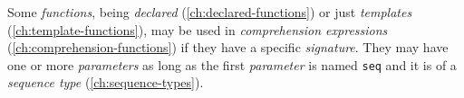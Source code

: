 Some \emph{functions},
being \emph{declared} (\ref{ch:declared-functions})
or just \emph{templates} (\ref{ch:template-functions}),
may be used in \emph{comprehension expressions} (\ref{ch:comprehension-functions})
if they have a specific \emph{signature}.
They may have one or more \emph{parameters}
as long as the first \emph{parameter} is named \verb|seq|
and it is of a \emph{sequence type} (\ref{ch:sequence-types}).
